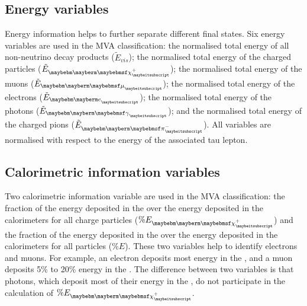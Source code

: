 
\subsection{Energy variables}

Energy information helps to further separate different final states. Six energy variables are used in the MVA classification: the normalised total energy of all non-neutrino decay products ($\tilde{E}_{vis}$); the normalised total energy of the charged particles ($\tilde{E}_{\charge}$); the normalised total energy of the muons ($\tilde{E}_{\Pmu}$); the normalised total energy of the electrons ($\tilde{E}_{\Pe}$); the normalised total energy of the photons ($\tilde{E}_{\Pgg}$); and the normalised total energy of the charged pions ($\tilde{E}_{\Pgpm}$). All variables are normalised with respect to the energy of the associated tau lepton.

\subsection{Calorimetric information variables}


Two calorimetric information variable are used in the MVA classification: the fraction of the energy  deposited in the \ECAL over the  energy deposited in the calorimeters for all charge particles ($\% E_{\charge}$) and the fraction of the energy  deposited in the \ECAL over the  energy deposited in the calorimeters for all particles ($\% E$). These  two variables help to identify electrons and muons. For example, an electron deposits most energy in the \ECAL, and a muon deposits 5\% to 20\% energy in the \ECAL. The difference between two variables is that photons, which deposit most of their energy in the \ECAL, do not participate in the calculation of $\% E_{\charge}$.




